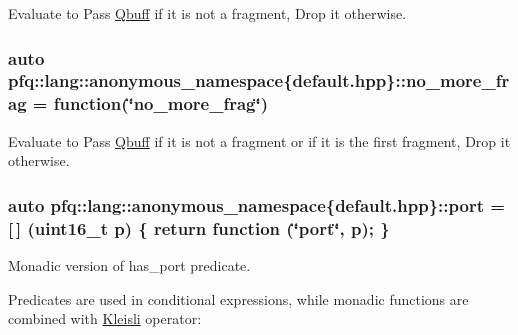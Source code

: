 Evaluate to {\ttfamily Pass} \hyperlink{structpfq_1_1lang_1_1Qbuff}{Qbuff} if it is not a fragment, {\ttfamily Drop} it otherwise. 

\subsubsection[{\texorpdfstring{no\+\_\+more\+\_\+frag}{no_more_frag}}]{\setlength{\rightskip}{0pt plus 5cm}auto pfq\+::lang\+::anonymous\+\_\+namespace\{default.\+hpp\}\+::no\+\_\+more\+\_\+frag = {\bf function}(\char`\"{}no\+\_\+more\+\_\+frag\char`\"{})}\hypertarget{namespacepfq_1_1lang_1_1anonymous__namespace_02default_8hpp_03_a88628ce70e2a650af1338851373b9891}{}\label{namespacepfq_1_1lang_1_1anonymous__namespace_02default_8hpp_03_a88628ce70e2a650af1338851373b9891}


Evaluate to {\ttfamily Pass} \hyperlink{structpfq_1_1lang_1_1Qbuff}{Qbuff} if it is not a fragment or if it is the first fragment, {\ttfamily Drop} it otherwise. 

\subsubsection[{\texorpdfstring{port}{port}}]{\setlength{\rightskip}{0pt plus 5cm}auto pfq\+::lang\+::anonymous\+\_\+namespace\{default.\+hpp\}\+::port = \mbox{[}$\,$\mbox{]} (uint16\+\_\+t p) \{ return {\bf function} (\char`\"{}port\char`\"{}, p); \}}\hypertarget{namespacepfq_1_1lang_1_1anonymous__namespace_02default_8hpp_03_a868eca03290a037cb4e9b7075085888b}{}\label{namespacepfq_1_1lang_1_1anonymous__namespace_02default_8hpp_03_a868eca03290a037cb4e9b7075085888b}


Monadic version of {\ttfamily has\+\_\+port} predicate. 

Predicates are used in conditional expressions, while monadic functions are combined with \hyperlink{structpfq_1_1lang_1_1Kleisli}{Kleisli} operator\+:

